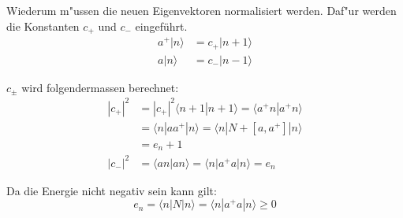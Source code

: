 Wiederum m"ussen die neuen Eigenvektoren normalisiert werden. Daf"ur werden die Konstanten $c_+$ und $c_-$ eingeführt.
\begin{equation}
\begin{split}
a^+|n\rangle &= c_+|n+1\rangle \\
a|n\rangle &= c_-|n-1\rangle
\end{split}
\end{equation}

$c_\pm$ wird folgendermassen berechnet:
\begin{equation}
\begin{split}
	|c_+|^2 &= |c_+|^2 \langle n+1 | n+1 \rangle = \langle a^+n | a^+n \rangle \\
		&= \langle n | aa^+ |n \rangle = \langle n | N + [a,a^+] |n \rangle \\
		&= e_n+1 \\
	|c_-|^2 &= 	\langle an | an \rangle = \langle n | a^+a | n \rangle = e_n
\end{split}
\end{equation}

Da die Energie nicht negativ sein kann gilt:
\begin{equation}
e_n = \langle n | N |n \rangle = \langle n | a^+a |n \rangle \geq 0
\end{equation}

